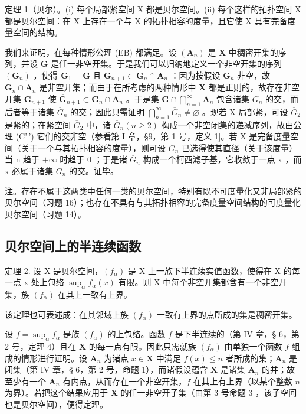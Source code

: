 定理 1（贝尔）。(i) 每个局部紧空间 X 都是贝尔空间。(ii) 每个这样的拓扑空间 X 都是贝尔空间：在 X 上存在一个与 X 的拓扑相容的度量，且它使 X 具有完备度量空间的结构。

我们来证明，在每种情形公理 (EB) 都满足。设 \((\mathbf{A}_n)\) 是 \(\mathbf{X}\) 中稠密开集的序列，并设 \(\mathbf{G}\) 是任一非空开集。于是我们可以归纳地定义一个非空开集的序列 \((\mathbf{G}_n)\) ，使得 \(\mathbf{G}_1 = \mathbf{G}\) 且 \(\overline{\mathbf{G}}_{n+1} \subset \mathbf{G}_n \cap \mathbf{A}_n\) ：因为按假设 \(\mathbf{G}_n\) 非空，故 \(\mathbf{G}_n \cap \mathbf{A}_n\) 是非空开集；而由于在所考虑的两种情形中 \(\mathbf{X}\) 都是正则的，故存在非空开集 \(\mathbf{G}_{n+1}\) 使 \(\overline{\mathbf{G}}_{n+1} \subset \mathbf{G}_n \cap \mathbf{A}_n\) 。于是集 \(\mathbf{G} \cap \bigcap_{n=1}^{\infty} \mathbf{A}_n\) 包含诸集 \(G_{n}\) 的交，而后者等于诸集 \(\overline{G}_{n}\) 的交；因此只需证明 \(\bigcap_{n=1}^{\infty}\overline{G}_{n}\neq\varnothing\) 。现若 X 局部紧，可设 \(\overline{G}_{2}\) 是紧的；在紧空间 \(\overline{G}_{2}\) 中，诸 \(\overline{G}_{n}(n\geqslant2)\) 构成一个非空闭集的递减序列，故由公理 (C'\,') 它们的交非空（参看第 I 章，§9，第 1 号，定义 1{]}。若 X 是完备度量空间（关于一个与其拓扑相容的度量），则可设 \(\overline{G}_{n}\) 已选得使其直径（关于该度量）当 n 趋于 \(+\infty\) 时趋于 0 ；于是诸 \(\overline{G}_{n}\) 构成一个柯西滤子基，它收敛于一点 x ，而 x 必属于诸集 \(\overline{G}_{n}\) 的交。证毕。

注。存在不属于这两类中任何一类的贝尔空间，特别有既不可度量化又非局部紧的贝尔空间（习题 16）；也存在不具有与其拓扑相容的完备度量空间结构的可度量化贝尔空间（习题 14）。

\subsection{贝尔空间上的半连续函数}

定理 2. 设 X 是贝尔空间，\((f_{\alpha})\) 是 X 上一族下半连续实值函数，使得在 X 的每一点 x 处上包络 \(\sup_{\alpha} f_{\alpha}(x)\) 有限。则 X 中每个非空开集都含有一个非空开集，族 \((f_{\alpha})\) 在其上一致有上界。

该定理也可表述成：在其邻域上族 \((f_{\alpha})\) 一致有上界的点所成的集是稠密开集。

设 \(f = \sup_{\alpha} f_{\alpha}\) 是族 \((f_{\alpha})\) 的上包络。函数 \(f\) 是下半连续的（第 IV 章，§ 6，第 2 号，定理 4）且在 \(\mathbf{X}\) 的每一点有限。因此只需就族 \((f_{\alpha})\) 由单独一个函数 \(f\) 组成的情形进行证明。设 \(\mathbf{A}_n\) 为诸点 \(x \in \mathbf{X}\) 中满足 \(f(x) \leqslant n\) 者所成的集；\(\mathbf{A}_n\) 是闭集（第 IV 章，§ 6，第 2 号，命题 1），而诸假设蕴含 \(\mathbf{X}\) 是诸集 \(\mathbf{A}_n\) 的并；故至少有一个 \(\mathbf{A}_n\) 有内点，从而存在一个非空开集，\(f\) 在其上有上界（以某个整数 \(n\) 为界）。若把这个结果应用于 \(\mathbf{X}\) 的任一非空开子集（由第 3 号命题 3 ，该子空间也是贝尔空间），便得定理。

